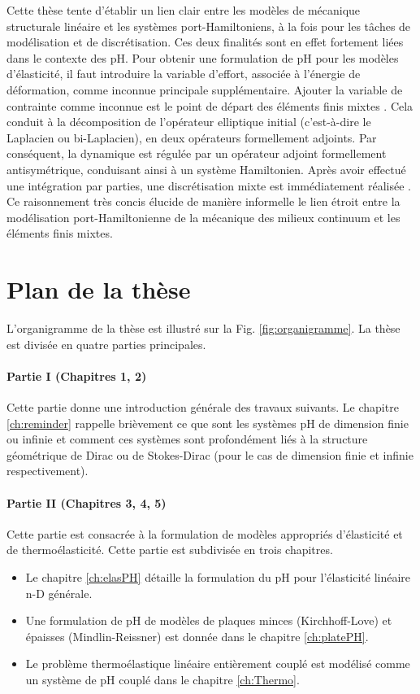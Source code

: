 Cette thèse tente d'établir un lien clair entre les modèles de mécanique structurale linéaire et les systèmes port-Hamiltoniens, à la fois pour les tâches de modélisation et de discrétisation. Ces deux finalités sont en effet fortement liées dans le contexte des pH. Pour obtenir une formulation de pH pour les modèles d'élasticité, il faut introduire la variable d'effort, associée à l'énergie de déformation, comme inconnue principale supplémentaire. Ajouter la variable de contrainte comme inconnue est le point de départ des éléments finis mixtes \cite{arnold1990intro}. Cela conduit à la décomposition de l'opérateur elliptique initial (c'est-à-dire le Laplacien ou bi-Laplacien), en deux opérateurs formellement adjoints. Par conséquent, la dynamique est régulée par un opérateur adjoint formellement antisymétrique, conduisant ainsi à un système Hamiltonien. Après avoir effectué une intégration par parties, une discrétisation mixte est immédiatement réalisée \cite{joly2003variational}. Ce raisonnement très concis élucide de manière informelle le lien étroit entre la modélisation port-Hamiltonienne de la mécanique des milieux continuum et les éléments finis mixtes.

\section{Plan de la thèse}

L'organigramme de la thèse est illustré sur la Fig. \ref{fig:organigramme}. La thèse est divisée en quatre parties principales.

\paragraph{Partie I (Chapitres 1, 2)}
Cette partie donne une introduction générale des travaux suivants. Le chapitre \ref{ch:reminder} rappelle brièvement ce que sont les systèmes pH de dimension finie ou infinie et comment ces systèmes sont profondément liés à la structure géométrique de Dirac ou de Stokes-Dirac (pour le cas de dimension finie et infinie respectivement).

\paragraph{Partie II (Chapitres 3, 4, 5)}
Cette partie est consacrée à la formulation de modèles appropriés d'élasticité et de thermoélasticité. Cette partie est subdivisée en trois chapitres.
\begin{itemize}
\item Le chapitre \ref{ch:elasPH} détaille la formulation du pH pour l'élasticité linéaire n-D générale.
\item Une formulation de pH de modèles de plaques minces (Kirchhoff-Love) et épaisses (Mindlin-Reissner) est donnée dans le chapitre \ref{ch:platePH}.
\item Le problème thermoélastique linéaire entièrement couplé est modélisé comme un système de pH couplé dans le chapitre \ref{ch:Thermo}.
\end{itemize}


